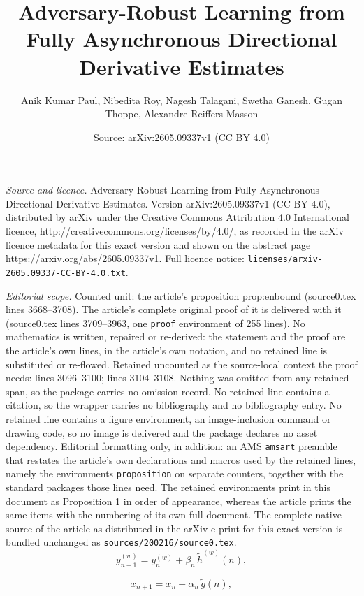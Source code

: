 \documentclass[10pt,a4paper]{amsart}
\title{Adversary-Robust Learning from Fully Asynchronous Directional Derivative Estimates}
\author{Anik Kumar Paul, Nibedita Roy, Nagesh Talagani, Swetha Ganesh, Gugan Thoppe, Alexandre Reiffers-Masson}
\date{Source: arXiv:2605.09337v1 (CC BY 4.0)}
\begin{document}
\maketitle

\noindent\emph{Source and licence.} Adversary-Robust Learning from Fully Asynchronous Directional Derivative Estimates. Version arXiv:2605.09337v1 (CC BY 4.0), distributed by arXiv under the Creative Commons Attribution 4.0 International licence, http://creativecommons.org/licenses/by/4.0/, as recorded in the arXiv licence metadata for this exact version and shown on the abstract page https://arxiv.org/abs/2605.09337v1. Full licence notice: \texttt{licenses/arxiv-2605.09337-CC-BY-4.0.txt}.\par\smallskip

\noindent\textit{Editorial scope.} Counted unit: the article's proposition prop:enbound (source0.tex lines 3668--3708). The article's complete original proof of it is delivered with it (source0.tex lines 3709--3963, one \texttt{proof} environment of 255 lines). No mathematics is written, repaired or re-derived: the statement and the proof are the article's own lines, in the article's own notation, and no retained line is substituted or re-flowed.  Retained uncounted as the source-local context the proof needs: lines 3096--3100; lines 3104--3108.  Nothing was omitted from any retained span, so the package carries no omission record.  No retained line contains a citation, so the wrapper carries no bibliography and no bibliography entry.  No retained line contains a figure environment, an image-inclusion command or drawing code, so no image is delivered and the package declares no asset dependency.  Editorial formatting only, in addition: an AMS \texttt{amsart} preamble that restates the article's own declarations and macros used by the retained lines, namely the environments \texttt{proposition} on separate counters, together with the standard packages those lines need.  The retained environments print in this document as Proposition 1 in order of appearance, whereas the article prints the same items with the numbering of its own full document.  The complete native source of the article as distributed in the arXiv e-print for this exact version is bundled unchanged as \texttt{sources/200216/source0.tex}.
\begin{equation}
y_{n+1}^{(w)} 
= y_n^{(w)} + \beta_n\,\widetilde{h}^{(w)}(n),
\label{eq:slow time scaleA}
\end{equation}

\begin{equation}
x_{n+1} 
= x_n + \alpha_n\,\widetilde{g}(n),
\label{eq:fast time scaleB}
\end{equation}
\end{document}
